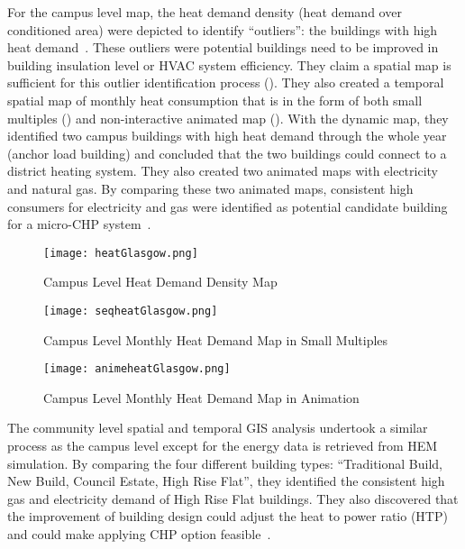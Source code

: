 For the campus level map, the heat demand density (heat demand over
conditioned area) were depicted to identify ``outliers'': the
buildings with high heat demand~\cite{Diaz2013campus}. These outliers
were potential buildings need to be improved in building insulation
level or HVAC system efficiency. They claim a spatial map is
sufficient for this outlier identification process
(). They also created a temporal spatial map of
monthly heat consumption that is in the form of both small multiples
() and non-interactive animated map
(). With the dynamic map, they identified
two campus buildings with high heat demand through the whole year
(anchor load building) and concluded that the two buildings could
connect to a district heating system. They also created two animated
maps with electricity and natural gas. By comparing these two animated
maps, consistent high consumers for electricity and gas were
identified as potential candidate building for a micro-CHP
system~\cite{microCHP}.

\begin{figure}[h!]
  \centering
  \texttt{[image: heatGlasgow.png]}
  \caption[Heat Demand Density]{Campus Level Heat Demand Density Map~\cite{Diaz2013campus}}
  \label{fig:heatGlasgow}
\end{figure}

\begin{figure}[h!]
  \centering
  \texttt{[image: seqheatGlasgow.png]}
  \caption[Monthly Heat Demand (Small Multiple)]{Campus Level Monthly Heat Demand Map in Small Multiples\cite{Diaz2013campus}}
  \label{fig:seqheatGlasgow}
\end{figure}

\begin{figure}[h!]
  \centering
  \texttt{[image: animeheatGlasgow.png]}
  \caption[Campus Animated Map]{Campus Level Monthly Heat Demand Map in Animation\cite{Diaz2013campus}}
  \label{fig:animeheatGlasgow}
\end{figure}

The community level spatial and temporal GIS analysis undertook a
similar process as the campus level except for the energy data is
retrieved from HEM simulation. By comparing the four different
building types: ``Traditional Build, New Build, Council Estate, High
Rise Flat'', they identified the consistent high gas and electricity
demand of High Rise Flat buildings. They also discovered that the
improvement of building design could adjust the heat to power ratio
(HTP) and could make applying CHP option feasible~\cite{Diaz2013com}.

